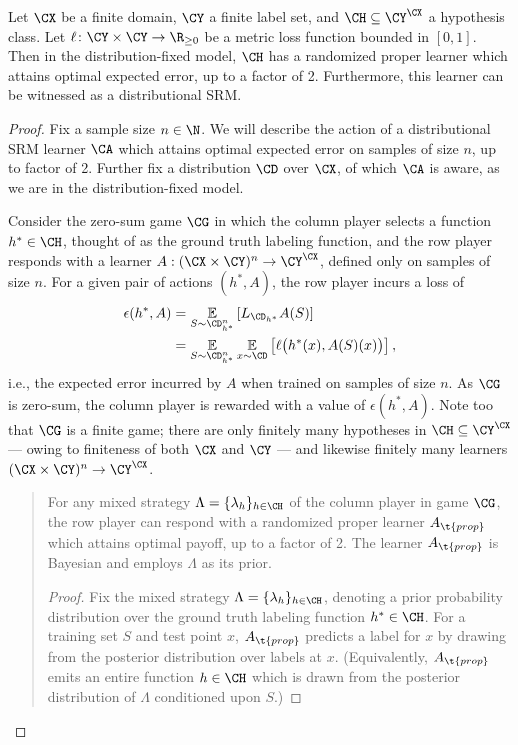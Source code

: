 \documentclass[11pt]{article}
\begin{document}
\vspace{0.3 cm}
\begin{theorem}\label{Theorem:randomized-proper-for-finite-problems}
Let $\CX$ be a finite domain, $\CY$ a finite label set, and $\CH \subseteq \CY^\CX$ a hypothesis class. Let $\ell \colon \CY \times \CY \to \R_{\geq 0}$ be a metric loss function bounded in $[0, 1]$. Then in the distribution-fixed model, $\CH$ has a randomized proper learner which attains optimal expected error, up to a factor of 2. Furthermore, this learner can be witnessed as a distributional SRM.
\end{theorem}
\begin{proof}
Fix a sample size $n \in \N$. We will describe the action of a distributional SRM learner $\CA$ which attains optimal expected error on samples of size $n$, up to factor of 2. Further fix a distribution $\CD$ over $\CX$, of which $\CA$ is aware, as we are in the distribution-fixed model. 

Consider the zero-sum game $\CG$ in which the column player selects a function $h^* \in \CH$, thought of as the ground truth labeling function, and the row player responds with a learner $A: (\CX \times \CY)^n \to \CY^\CX$, defined only on samples of size $n$. For a given pair of actions $(h^*, A)$, the row player incurs a loss of 
\begin{align*}
\epsilon(h^*, A) &=  \E_{S \sim \CD_{h^*}^n} \left[ L_{\CD_{h^*}} A(S) \right] \\
&= \E_{S \sim \CD_{h^*}^n} \E_{x \sim \CD}  \left[  \ell\big(h^*(x), A(S)(x)\big) \right], 
\end{align*} 
i.e., the expected error incurred by $A$ when trained on samples of size $n$. As $\CG$ is zero-sum, the column player is rewarded with a value of $\epsilon(h^*, A)$. Note too that $\CG$ is a finite game; there are only finitely many  hypotheses in $\CH \subseteq \CY^\CX$ --- owing to finiteness of both $\CX$ and $\CY$ --- and likewise finitely many learners $(\CX \times \CY)^n \to \CY^\CX$. 
\vspace{-0.6 cm}
\begin{quote}
\begin{lemma}\label{Lemma:factor-2-game}
For any mixed strategy $\Lambda = \{\lambda_h\}_{h \in \CH}$ of the column player in game $\CG$, the row player can respond with a randomized proper learner $A_{\t{prop}}$ which attains optimal payoff, up to a factor of 2. The learner $A_{\t{prop}}$ is Bayesian and employs $\Lambda$ as its prior. 
\end{lemma}
\begin{proof}
Fix the mixed strategy $\Lambda = \{\lambda_h\}_{h \in \CH}$, denoting a prior probability distribution over the ground truth labeling function $h^* \in \CH$. For a training set $S$ and test point $x$, $A_{\t{prop}}$ predicts a label for $x$ by drawing from the posterior distribution over labels at $x$. (Equivalently, $A_{\t{prop}}$ emits an entire function $h \in \CH$ which is drawn from the posterior distribution of $\Lambda$ conditioned upon $S$.)


\end{proof}
\end{quote}
\end{proof}
\end{document}
